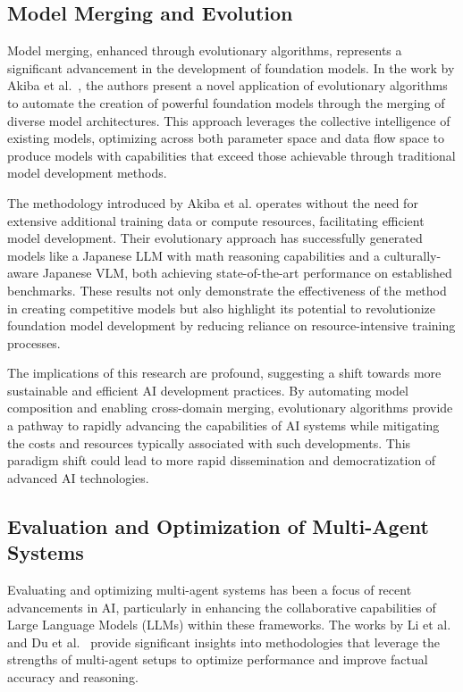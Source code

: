 \subsection{Model Merging and Evolution}
Model merging, enhanced through evolutionary algorithms, represents a significant advancement in the development of foundation models. In the work by Akiba et al.~\cite{akiba2024evolutionary}, the authors present a novel application of evolutionary algorithms to automate the creation of powerful foundation models through the merging of diverse model architectures. This approach leverages the collective intelligence of existing models, optimizing across both parameter space and data flow space to produce models with capabilities that exceed those achievable through traditional model development methods.

The methodology introduced by Akiba et al. operates without the need for extensive additional training data or compute resources, facilitating efficient model development. Their evolutionary approach has successfully generated models like a Japanese LLM with math reasoning capabilities and a culturally-aware Japanese VLM, both achieving state-of-the-art performance on established benchmarks. These results not only demonstrate the effectiveness of the method in creating competitive models but also highlight its potential to revolutionize foundation model development by reducing reliance on resource-intensive training processes.

The implications of this research are profound, suggesting a shift towards more sustainable and efficient AI development practices. By automating model composition and enabling cross-domain merging, evolutionary algorithms provide a pathway to rapidly advancing the capabilities of AI systems while mitigating the costs and resources typically associated with such developments. This paradigm shift could lead to more rapid dissemination and democratization of advanced AI technologies.


\subsection{Evaluation and Optimization of Multi-Agent Systems}
Evaluating and optimizing multi-agent systems has been a focus of recent advancements in AI, particularly in enhancing the collaborative capabilities of Large Language Models (LLMs) within these frameworks. The works by Li et al.~\cite{li2024agents} and Du et al.~\cite{du2023improving} provide significant insights into methodologies that leverage the strengths of multi-agent setups to optimize performance and improve factual accuracy and reasoning.

